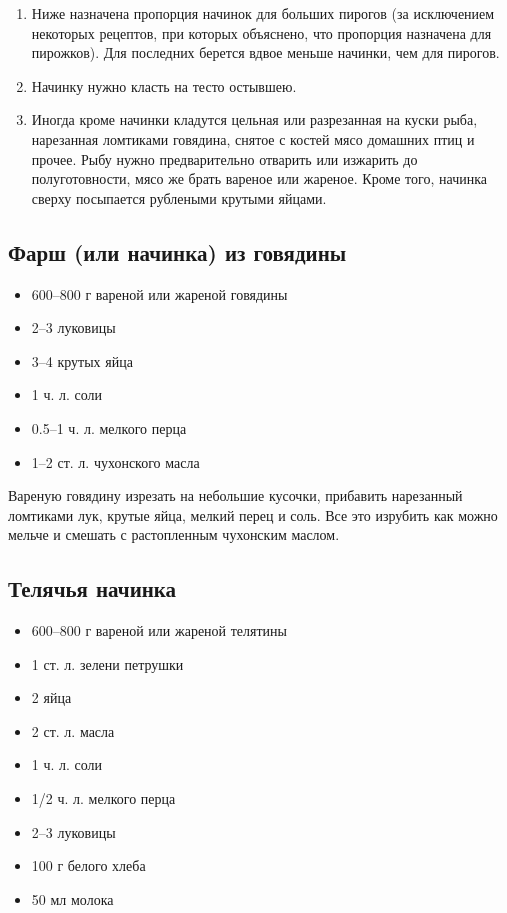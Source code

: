\begin{enumerate}
	\item Ниже назначена пропорция начинок для больших пирогов (за исключением некоторых рецептов, при которых объяснено, что пропорция назначена для пирожков). Для последних берется вдвое меньше начинки, чем для пирогов.
    \item Начинку нужно класть на тесто остывшею.
	\item Иногда кроме начинки кладутся цельная или разрезанная на куски рыба, нарезанная ломтиками говядина, снятое с костей мясо домашних птиц и прочее. Рыбу нужно предварительно отварить или изжарить до полуготовности, мясо же брать вареное или жареное. Кроме того, начинка сверху посыпается рублеными крутыми яйцами.
\end{enumerate}

\subsection{Фарш (или начинка) из говядины}\label{1farsh-gov}

\begin{itemize}
	\item 600–800 г вареной или жареной говядины 
    \item 2–3 луковицы 
    \item 3–4 крутых яйца 
    \item 1 ч. л. соли
    \item 0.5–1 ч. л. мелкого перца
    \item 1–2 ст. л. чухонского масла
\end{itemize}

Вареную говядину изрезать на небольшие кусочки, прибавить нарезанный ломтиками лук, крутые яйца, мелкий перец и соль. Все это изрубить как можно мельче и смешать с растопленным чухонским маслом.

\subsection{Телячья начинка}

\begin{itemize}
	\item 600–800 г вареной или жареной телятины 
    \item 1 ст. л. зелени петрушки 
    \item 2 яйца 
    \item 2 ст. л. масла 
    \item 1 ч. л. соли 
    \item 1/2 ч. л. мелкого перца 
    \item 2–3 луковицы 
    \item 100 г белого хлеба 
    \item 50 мл молока
\end{itemize}

